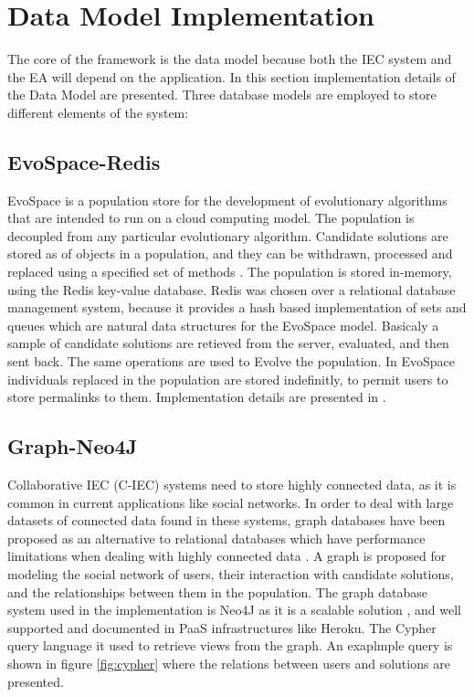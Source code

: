 \section{Data Model Implementation}
\label{sec:implementation}

The core of the framework is the data model because both the IEC system and the EA will 
depend on the application. In this section implementation details of the Data Model are presented.
Three database models are employed to store different elements of the system: 

  \subsection{EvoSpace-Redis}
EvoSpace is a population store \cite{Evospace}  for the development of 
evolutionary algorithms that are intended to run on a cloud computing model. 
The population is decoupled from any particular evolutionary algorithm. 
Candidate solutions are stored as of objects in a population, and they can be withdrawn, 
processed and replaced using a specified set of methods \cite{GValdez2015}. The population
is stored in-memory, using the Redis key-value database. Redis was chosen over a relational 
database management system, because it provides a hash based implementation of sets and 
queues which are natural data structures for the EvoSpace model. Basicaly a sample of 
candidate solutions are retieved from the server, evaluated, and then sent back. 
The same operations are used to Evolve the population. In EvoSpace individuals replaced 
in the population are stored indefinitly, to permit users to store permalinks to them.
Implementation details are presented in \cite{garcia2013evospace}.

\subsection{Graph-Neo4J}
 Collaborative IEC (C-IEC) systems need to store highly connected data, as it is common 
 in current applications like social networks. In order to deal with large datasets of connected 
 data found in these systems, graph databases \cite{angles2012comparison} have been proposed 
 as an alternative to relational databases which have performance limitations when dealing with 
 highly connected data \cite{holzschuher2013performance}.
 A graph is proposed for modeling the social network of users, their interaction with 
 candidate solutions, and the relationships between them in the population.
 The graph database system used in the implementation is Neo4J as it is
 a scalable solution \cite{miller2013graph,holzschuher2013performance}, and well 
 supported and documented in PaaS infrastructures like Heroku. The Cypher query 
 language it used to retrieve views from the graph.
 An exaplmple query is shown in figure \ref{fig:cypher} where the relations 
 between users and solutions are presented.
  
